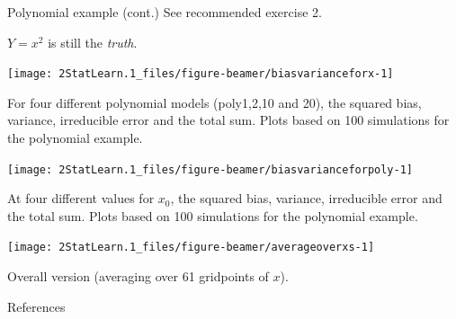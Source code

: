 \documentclass[
  ignorenonframetext,
]{beamer}
\begin{document}
\begin{frame}
\begin{block}{Polynomial example (cont.)}
\protect\hypertarget{polynomial-example-cont.}{}
See recommended exercise 2.

\vspace{2mm}

\(Y=x^2\) is still the \emph{truth}.

\vspace{2mm}

\begin{center}\texttt{[image: 2StatLearn.1\_files/figure-beamer/biasvarianceforx-1]} \end{center}

For four different polynomial models (poly1,2,10 and 20), the squared
bias, variance, irreducible error and the total sum. Plots based on 100
simulations for the polynomial example.
\end{block}
\end{frame}

\begin{frame}
\begin{center}\texttt{[image: 2StatLearn.1\_files/figure-beamer/biasvarianceforpoly-1]} \end{center}

At four different values for \(x_0\), the squared bias, variance,
irreducible error and the total sum. Plots based on 100 simulations for
the polynomial example.
\end{frame}

\begin{frame}
\begin{center}\texttt{[image: 2StatLearn.1\_files/figure-beamer/averageoverxs-1]} \end{center}

Overall version (averaging over 61 gridpoints of \(x\)).
\end{frame}

\begin{frame}{References}
\protect\hypertarget{references}{}
\end{frame}
\end{document}
